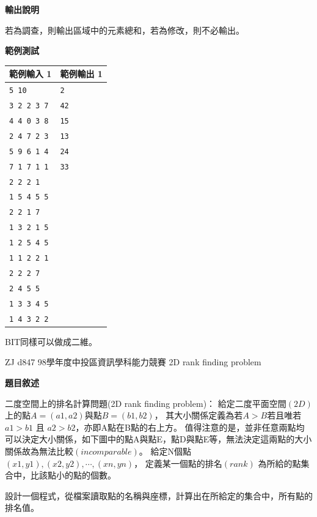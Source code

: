     \textbf{輸出說明}

    若為調查，則輸出區域中的元素總和，若為修改，則不必輸出。

    \textbf{範例測試}

    \begin{tabular}{|m{7cm}|m{7cm}|}
        \hline
        範例輸入 1 & 範例輸出 1 \\
        \hline
        \verb|5 10|      & \verb|2| \\
        \verb|3 2 2 3 7| & \verb|42| \\
        \verb|4 4 0 3 8| & \verb|15| \\
        \verb|2 4 7 2 3| & \verb|13| \\
        \verb|5 9 6 1 4| & \verb|24| \\
        \verb|7 1 7 1 1| & \verb|33| \\
        \verb|2 2 2 1| & \\
        \verb|1 5 4 5 5| & \\
        \verb|2 2 1 7| & \\
        \verb|1 3 2 1 5| & \\
        \verb|1 2 5 4 5| & \\
        \verb|1 1 2 2 1| & \\
        \verb|2 2 2 7| & \\
        \verb|2 4 5 5| & \\
        \verb|1 3 3 4 5| & \\
        \verb|1 4 3 2 2| & \\
        \hline
    \end{tabular}

    \begin{tip}
        BIT同樣可以做成二維。
    \end{tip}

    \problem ZJ d847 98學年度中投區資訊學科能力競賽 2D rank finding problem

    \textbf{題目敘述}

    二度空間上的排名計算問題(2D rank finding problem)：
    給定二度平面空間$(2D)$上的點$A = (a1,a2)$與點$B = (b1,b2)$，
    其大小關係定義為若$A > B$若且唯若 $a1> b1$ 且 $a2 > b2$，亦即A點在B點的右上方。
    值得注意的是，並非任意兩點均可以決定大小關係，如下圖中的點A與點E，點D與點E等，無法決定這兩點的大小關係故為無法比較$(incomparable)$。
    給定N個點$(x1,y1), (x2,y2), \cdots, (xn,yn)$，
    定義某一個點的排名$(rank)$ 為所給的點集合中，比該點小的點的個數。

    設計一個程式，從檔案讀取點的名稱與座標，計算出在所給定的集合中，所有點的排名值。

